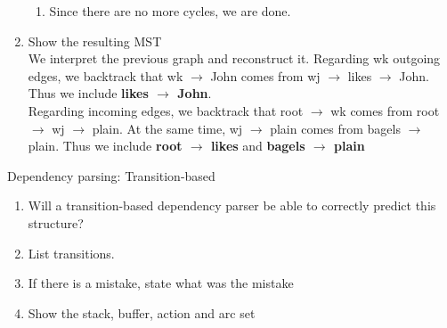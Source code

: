 \documentclass[12pt]{article}
\newenvironment{exercise}[2][Exercise]{\begin{trivlist}
\item[\hskip \labelsep {\bfseries #1}\hskip \labelsep {\bfseries #2.}]}{\end{trivlist}}
\begin{document}
\begin{exercise}{4}
\begin{enumerate}[label=(\alph*)]
\begin{enumerate}
\item Since there are no more cycles, we are done.

\end{enumerate}

\item Show the resulting MST \\

We interpret the previous graph and reconstruct it. Regarding wk outgoing edges, we backtrack that wk $\rightarrow$ John comes from wj $\rightarrow$ likes $\rightarrow$ John. Thus we include \textbf{likes $\rightarrow$ John}. \\

Regarding incoming edges, we backtrack that root $\rightarrow$ wk comes from root $\rightarrow$ wj $\rightarrow$ plain. At the same time, wj $\rightarrow$ plain comes from bagels $\rightarrow$ plain. Thus we include \textbf{root $\rightarrow$ likes} and \textbf{bagels $\rightarrow$ plain}


\end{enumerate}
\end{exercise}
 
\begin{exercise}{5} Dependency parsing: Transition-based \\
\begin{enumerate}[label=(\alph*)]

\item Will a transition-based dependency parser be able to correctly predict this structure? \\ 

\item List transitions. \\

\item If there is a mistake, state what was the mistake \\

\item Show the stack, buffer, action and arc set \\

\end{enumerate}
\end{exercise} 
 
 
\end{document}
